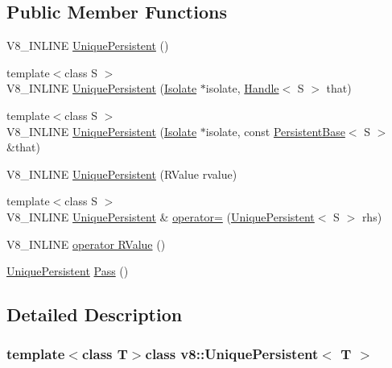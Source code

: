 \subsection*{Public Member Functions}
\begin{DoxyCompactItemize}
\item 
V8\-\_\-\-I\-N\-L\-I\-N\-E \hyperlink{classv8_1_1UniquePersistent_adab1460f2350842ea97e9ac63b3b3692}{Unique\-Persistent} ()
\item 
{\footnotesize template$<$class S $>$ }\\V8\-\_\-\-I\-N\-L\-I\-N\-E \hyperlink{classv8_1_1UniquePersistent_af7dbba9e4b73104d0a1950c215426a57}{Unique\-Persistent} (\hyperlink{classv8_1_1Isolate}{Isolate} $\ast$isolate, \hyperlink{classv8_1_1Handle}{Handle}$<$ S $>$ that)
\item 
{\footnotesize template$<$class S $>$ }\\V8\-\_\-\-I\-N\-L\-I\-N\-E \hyperlink{classv8_1_1UniquePersistent_a795e5299871d11469dc2e1c637eb76fa}{Unique\-Persistent} (\hyperlink{classv8_1_1Isolate}{Isolate} $\ast$isolate, const \hyperlink{classv8_1_1PersistentBase}{Persistent\-Base}$<$ S $>$ \&that)
\item 
V8\-\_\-\-I\-N\-L\-I\-N\-E \hyperlink{classv8_1_1UniquePersistent_a73c1edaf902755a71c1236f91388ef5a}{Unique\-Persistent} (R\-Value rvalue)
\item 
{\footnotesize template$<$class S $>$ }\\V8\-\_\-\-I\-N\-L\-I\-N\-E \hyperlink{classv8_1_1UniquePersistent}{Unique\-Persistent} \& \hyperlink{classv8_1_1UniquePersistent_aa533c3aff16091f332a0f892a658e70c}{operator=} (\hyperlink{classv8_1_1UniquePersistent}{Unique\-Persistent}$<$ S $>$ rhs)
\item 
V8\-\_\-\-I\-N\-L\-I\-N\-E \hyperlink{classv8_1_1UniquePersistent_a06e8c1c5be0b982a02e48e81df0b9794}{operator R\-Value} ()
\item 
\hyperlink{classv8_1_1UniquePersistent}{Unique\-Persistent} \hyperlink{classv8_1_1UniquePersistent_ace8f7fa76e5d36afd3ae8ee94acff00f}{Pass} ()
\end{DoxyCompactItemize}


\subsection{Detailed Description}
\subsubsection*{template$<$class T$>$class v8\-::\-Unique\-Persistent$<$ T $>$}

